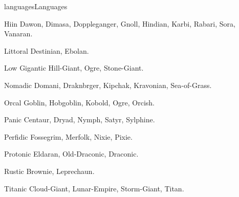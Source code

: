 \begin{Skill}[2.1]{languages}{Languages}
\begin{Description}
\item[Hiin]  Dawon,  Dimasa,  Doppleganger,  Gnoll,  Hindian, Karbi, Rabari, Sora, Vanaran. 

\item[Littoral] Destinian, Ebolan. 

\item[Low] Gigantic Hill-Giant, Ogre, Stone-Giant. 

\item[Nomadic] Domani, Draknbrger, Kipchak, Kravonian, Sea-of-Grass.

\item[Orcal] Goblin, Hobgoblin, Kobold, Ogre, Orcish.  

\item[Panic] Centaur, Dryad, Nymph, Satyr, Sylphine.  

\item[Perfidic] Fossegrim, Merfolk, Nixie, Pixie.  

\item[Protonic] Eldaran, Old-Draconic, Draconic.  

\item[Rustic] Brownie, Leprechaun. 

\item[Titanic]  Cloud-Giant,  Lunar-Empire,  Storm-Giant, 
Titan. 

\end{Description}

\end{Skill}
